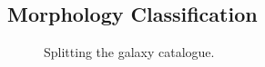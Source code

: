 \subsection{Morphology Classification}
\begin{figure}[H]
	\centering
	\caption{Splitting the galaxy catalogue.}
	\label{fig:c1}
\end{figure}
